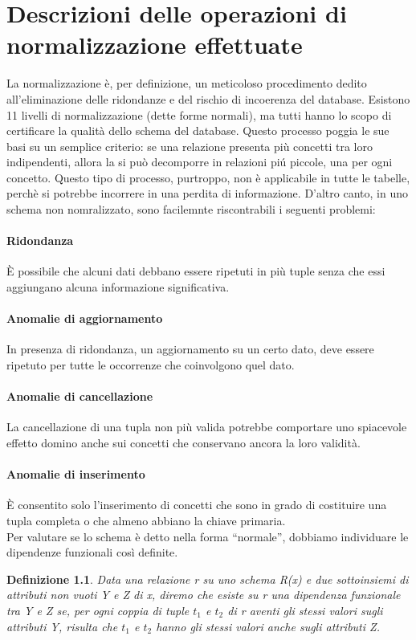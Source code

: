 \documentclass[a4paper, 10pt]{report}
\begin{document}
\chapter{Descrizioni delle operazioni di normalizzazione effettuate}
La normalizzazione \`e, per definizione, un meticoloso procedimento dedito all'eliminazione delle ridondanze e del rischio di incoerenza del database. Esistono 11 livelli di normalizzazione (dette forme normali), ma tutti hanno lo scopo di certificare la qualit\`a dello schema del database. Questo processo poggia le sue basi su un semplice criterio: se una relazione presenta più concetti tra loro indipendenti, allora la si pu\`o decomporre in relazioni pi\'u piccole, una per ogni concetto. Questo tipo di processo, purtroppo, non \`e applicabile in tutte le tabelle, perch\`e si potrebbe incorrere in una perdita di informazione. D'altro canto, in uno schema non nomralizzato, sono facilemnte riscontrabili i seguenti problemi:
\subsubsection{Ridondanza}
\`E possibile che alcuni dati debbano essere ripetuti in pi\`u tuple senza che essi aggiungano alcuna informazione significativa.
\subsubsection{Anomalie di aggiornamento}
In presenza di ridondanza, un aggiornamento su un certo dato, deve essere ripetuto per tutte le occorrenze che coinvolgono quel dato.
\subsubsection{Anomalie di cancellazione}
La cancellazione di una tupla non pi\`u valida potrebbe comportare uno spiacevole effetto domino anche sui concetti che conservano ancora la loro validit\`a.
\subsubsection{Anomalie di inserimento}
\`E consentito solo l'inserimento di concetti che sono in grado di costituire una tupla completa o che almeno abbiano la chiave primaria.\\
Per valutare se lo schema \`e detto nella forma ``normale'', dobbiamo individuare le dipendenze funzionali cos\`i definite.
\newtheorem{mydef}{Definizione}
\begin{mydef}
Data una relazione r su uno schema R(x) e due sottoinsiemi di attributi non vuoti Y e Z di x, diremo che esiste su r una dipendenza funzionale tra Y e Z se, per ogni coppia di tuple $t_1$ e $t_2$ di r aventi gli stessi valori sugli attributi Y, risulta che $t_1$ e $t_2$ hanno gli stessi valori anche sugli attributi Z.
\end{mydef}
\end{document}
